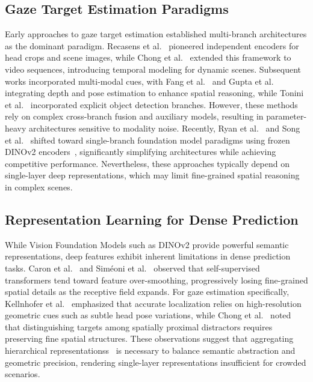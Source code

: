 \documentclass[sigconf,review,anonymous,screen]{acmart}
\begin{document}
\subsection{Gaze Target Estimation Paradigms}
\label{subsec:paradigm}
Early approaches to gaze target estimation established multi-branch architectures as the dominant paradigm. Recasens et al.~\cite{recasens2015they} pioneered independent encoders for head crops and scene images, while Chong et al.~\cite{chong2020detecting} extended this framework to video sequences, introducing temporal modeling for dynamic scenes. Subsequent works incorporated multi-modal cues, with Fang et al.~\cite{fang2021dual} and Gupta et al.~\cite{gupta2022modular} integrating depth and pose estimation to enhance spatial reasoning, while Tonini et al.~\cite{tonini2023object} incorporated explicit object detection branches.  However, these methods rely on complex cross-branch fusion and auxiliary models, resulting in parameter-heavy architectures sensitive to modality noise. Recently, Ryan et al.~\cite{ryan2025gaze} and Song et al.~\cite{song2024vitgaze} shifted toward single-branch foundation model paradigms using frozen DINOv2 encoders~\cite{oquab2023dinov2}, significantly simplifying architectures while achieving competitive performance. Nevertheless, these approaches typically depend on single-layer deep representations, which may limit fine-grained spatial reasoning in complex scenes.

\subsection{Representation Learning for Dense Prediction}
\label{subsec:representation}

While Vision Foundation Models such as DINOv2 provide powerful semantic representations, deep features exhibit inherent limitations in dense prediction tasks. Caron et al.~\cite{caron2021emerging} and Sim\'eoni et al.~\cite{simeoni2021localizing} observed that self-supervised transformers tend toward feature over-smoothing, progressively losing fine-grained spatial details as the receptive field expands. For gaze estimation specifically, Kellnhofer et al.~\cite{kellnhofer2019gaze360} emphasized that accurate localization relies on high-resolution geometric cues such as subtle head pose variations, while Chong et al.~\cite{chong2020detecting} noted that distinguishing targets among spatially proximal distractors requires preserving fine spatial structures. These observations suggest that aggregating hierarchical representationss~\cite{lin2017feature} is necessary to balance semantic abstraction and geometric precision, rendering single-layer representations insufficient for crowded scenarios.
\end{document}
